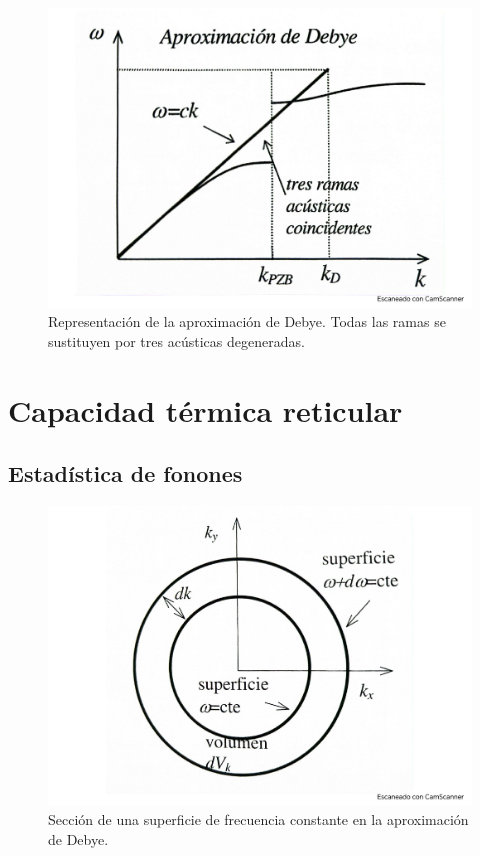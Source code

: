 \begin{figure}[h!] \centering
    \includegraphics[scale=0.5]{Cuerpo/Ch_05/Fotos libro 2.pdf}
    \caption{Representación de la aproximación de Debye. Todas las ramas se sustituyen por tres acústicas degeneradas.}
    \label{Fig:05-02}
\end{figure}    


\section{Capacidad térmica reticular}

\subsection{Estadística de fonones}

\begin{figure}[h!] \centering
    \includegraphics[scale=0.5]{Cuerpo/Ch_05/Fotos libro 3.pdf}
    \caption{Sección de una superficie de frecuencia constante en la aproximación de Debye.}
    \label{Fig:05-03}
\end{figure}    


